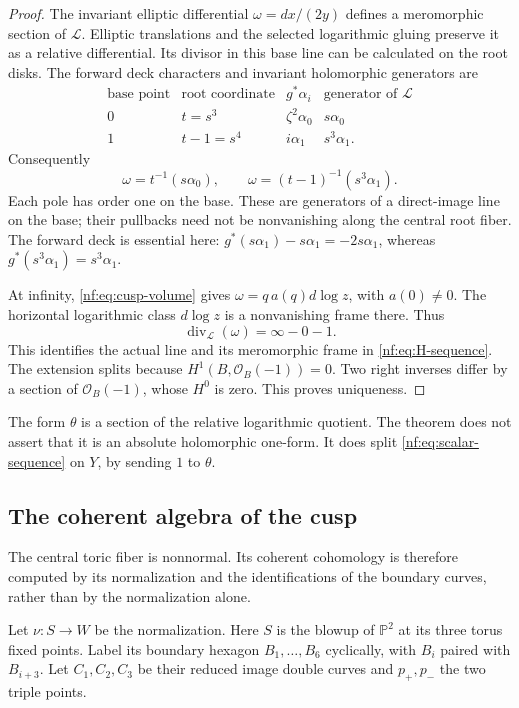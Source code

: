 \begin{proof}
The invariant elliptic differential
$\omega=dx/(2y)$ defines a meromorphic section of $\mathcal L$.
Elliptic translations and the selected logarithmic gluing preserve
it as a relative differential. Its divisor in this base line can
be calculated on the root disks. The forward deck characters and
invariant holomorphic generators are
\begin{equation}\label{nf:eq:horizontal-frames}
 \begin{array}{c|c|c|c}
 \text{base point}&\text{root coordinate}&g^*\alpha_i&
       \text{generator of }\mathcal L\\ \hline
 0&t=s^3&\zeta^2\alpha_0&s\alpha_0\\
 1&t-1=s^4&i\alpha_1&s^3\alpha_1 .
 \end{array}
\end{equation}
Consequently
\[
 \omega=t^{-1}(s\alpha_0),\qquad
 \omega=(t-1)^{-1}(s^3\alpha_1).
\]
Each pole has order one on the base. These are generators of a
direct-image line on the base; their pullbacks need not be
nonvanishing along the central root fiber.
The forward deck is essential here:
$g^*(s\alpha_1)-s\alpha_1=-2s\alpha_1$, whereas
$g^*(s^3\alpha_1)=s^3\alpha_1$.

At infinity, \eqref{nf:eq:cusp-volume} gives
$\omega=q\,a(q)d\log z$, with $a(0)\ne0$.
The horizontal logarithmic class $d\log z$ is a nonvanishing
frame there. Thus
\[
 \operatorname{div}_{\mathcal L}(\omega)=\infty-0-1.
\]
This identifies the actual line and its meromorphic frame in
\eqref{nf:eq:H-sequence}. The extension splits because
$H^1(B,\mathcal O_B(-1))=0$. Two right inverses differ by a
section of $\mathcal O_B(-1)$, whose $H^0$ is zero.
This proves uniqueness.
\end{proof}

The form $\theta$ is a section of the relative logarithmic
quotient. The theorem does not assert that it is an absolute
holomorphic one-form. It does split \eqref{nf:eq:scalar-sequence}
on $Y$, by sending $1$ to $\theta$.

\subsection{The coherent algebra of the cusp}

The central toric fiber is nonnormal. Its coherent cohomology is
therefore computed by its normalization and the identifications of
the boundary curves, rather than by the normalization alone.

Let $\nu:S\to W$ be the normalization. Here $S$ is the blowup of
$\mathbb P^2$ at its three torus fixed points. Label its boundary
hexagon $B_1,\ldots,B_6$ cyclically, with $B_i$ paired with
$B_{i+3}$. Let $C_1,C_2,C_3$ be their reduced image double curves
and $p_+,p_-$ the two triple points.

